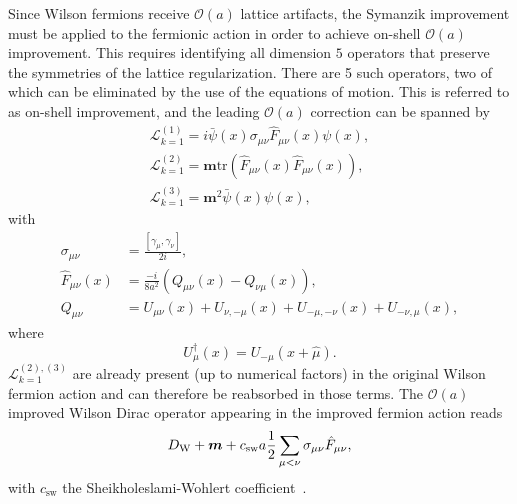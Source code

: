 Since Wilson fermions receive $\mathcal{O}(a)$ lattice artifacts, the Symanzik improvement must be applied to the fermionic action in order 
to achieve on-shell $\mathcal{O}(a)$ improvement. This requires identifying all dimension $5$ operators that preserve the symmetries of the lattice regularization. There are 5 such operators, two of which can be eliminated by the use of the equations of motion. This is referred to as on-shell improvement, and the leading $\mathcal{O}(a)$ correction can be spanned by 
\begin{gather}
\label{ch_foundation:eq:L1}
\mathcal{L}_{k=1}^{(1)}=i\bar{\psi}(x)\sigma_{\mu\nu}\hat{F}_{\mu\nu}(x)\psi(x),\\
\mathcal{L}_{k=1}^{(2)}=\boldsymbol{m}{\textrm{tr}}\left(\hat{F}_{\mu\nu}(x)\hat{F}_{\mu\nu}(x)\right),\\
\mathcal{L}_{k=1}^{(3)}=\boldsymbol{m}^2\bar{\psi}(x)\psi(x),
\end{gather}
with
\begin{align}
\label{ch_foundation:eq:dim5-op}
\sigma_{\mu\nu}&=\frac{\left[\gamma_{\mu},\gamma_{\nu}\right]}{2i},\\
\label{ch_foundation:eq:F_clover}
\hat{F}_{\mu\nu}(x)&=\frac{-i}{8a^2}\left(Q_{\mu\nu}(x)-Q_{\nu\mu}(x)\right),\\
Q_{\mu\nu}&=U_{\mu\nu}(x)+U_{\nu,-\mu}(x)+U_{-\mu,-\nu}(x)+U_{-\nu,\mu}(x),
\end{align}
where
\begin{equation}
U_{\mu}^{\dagger}(x)=U_{-\mu}(x+\hat{\mu}).
\end{equation}
$\mathcal{L}_{k=1}^{(2),(3)}$ are already present (up to numerical factors) in the original Wilson fermion action and can therefore be reabsorbed in those terms. The $\mathcal{O}(a)$ improved Wilson Dirac operator appearing in the improved fermion action reads
\begin{equation}
\label{ch_foundation:eq:DW_impr}
D_{\textrm W}+\boldsymbol{m}+c_{\textrm{sw}}a\frac{1}{2}\sum_{\mu<\nu}\sigma_{\mu\nu}\hat{F}_{\mu\nu},
\end{equation}
with $c_{\textrm{sw}}$ the Sheikholeslami-Wohlert coefficient~\citep{Sheikholeslami:1985ij}.

